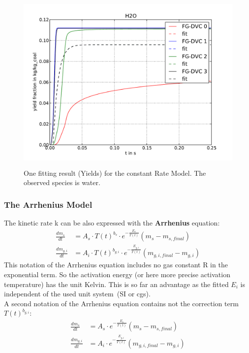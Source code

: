 \begin{figure}
\centering%
\includegraphics[height=9cm,angle=0]{Figures/FG-DVC-Fit_result_cR_H2O_Y}
\caption{One fitting result (Yields) for the constant Rate Model. The observed species is water.}
\label{F_Fit_cR_Y}
\end{figure}


\subsubsection{The Arrhenius Model}\label{SSS_Arrh}

The kinetic rate k can be also expressed with the \textbf{Arrhenius} equation:
\begin{align}\label{E_Arrhenius_s}
 \frac{dm_s}{dt}&=A_s \cdot T(t)^{b_s} \cdot e^{-\frac{E_s}{T(t)}}\left( m_{s} - m_{s,final} \right)\\
\label{E_Arrhenius_g}
 \frac{dm_{g,i}}{dt}&=A_i \cdot T(t)^{b_{g,i}} \cdot e^{-\frac{E_{g,i}}{T(t)}}\left(m_{g,i,final} - m_{g,i}\right)
\end{align}
This notation of the Arrhenius equation includes no gas constant R in the exponential term. So the activation energy (or here more precise activation temperature) has the unit Kelvin. This is so far an advantage as the fitted $E_i$ is independent of the used unit system~(SI or cgs).\\
A second notation of the Arrhenius equation contains not the correction term $T(t)^{b_{g,i}}$:
\begin{align}\label{E_Arrhenius_s_noB}
 \frac{dm_s}{dt}&=A_s \cdot e^{-\frac{E_s}{T(t)}}\left( m_{s} - m_{s,final} \right)\\
\label{E_Arrhenius_g_noB}
 \frac{dm_{g,i}}{dt}&=A_i \cdot e^{-\frac{E_{g,i}}{T(t)}}\left(m_{g,i,final} - m_{g,i}\right)
\end{align}

